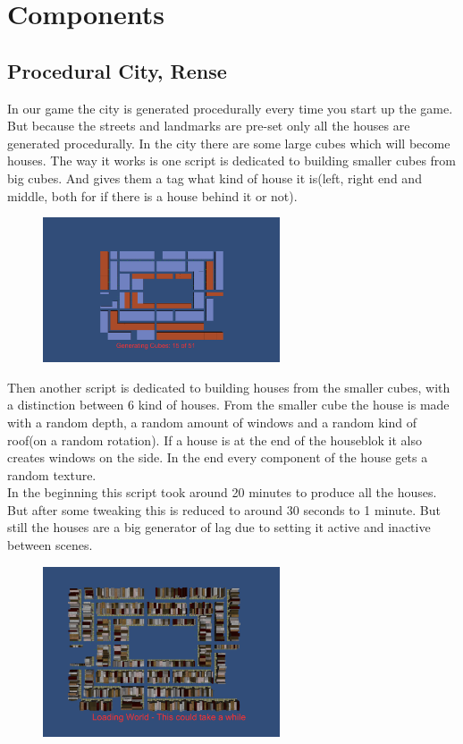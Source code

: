 \documentclass{article}
\begin{document}
\section{Components}

\subsection{Procedural City, Rense}
In our game the city is generated procedurally every time you start up the game. But because the streets and landmarks are pre-set only all the houses are generated procedurally. In the city there are some large cubes which will become houses. The way it works is one script is dedicated to building smaller cubes from big cubes. And gives them a tag what kind of house it is(left, right end and middle, both for if there is a house behind it or not). \\

	\begin{figure}[ht!]
		\centering
		\includegraphics[width=70mm]{images/Procedural.png}
	\end{figure}
Then another script is dedicated to building houses from the smaller cubes, with a distinction between 6 kind of houses. From the smaller cube the house is made with a random depth, a random amount of windows and a random kind of roof(on a random rotation). If a house is at the end of the houseblok it also creates windows on the side. In the end every component of the house gets a random texture.\\



In the beginning this script took around 20 minutes to produce all the houses. But after some tweaking this is reduced to around 30 seconds to 1 minute. But still the houses are a big generator of lag due to setting it active and inactive between scenes.

	\begin{figure}[ht!]
		\centering
		\includegraphics[width=70mm]{images/Generated.png}
	\end{figure}
\end{document}

